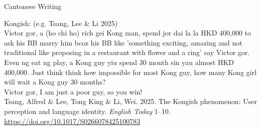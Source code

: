 \documentclass{beamer}
\begin{document}
\begin{frame}[fragile]{Cantonese Writing}

Kongish: (e.g. Tsang, Lee \& Li 2025)\\

\bigskip
Victor gor, a (ho chi ho) rich gei Kong man, spend jor dai la la HKD 400,000 to ask his BB marry him bcoz his BB like 'something exciting, amazing and not traditional like proposing in a restaurant with flower and a ring' say Victor gor.\\
\smallskip
Even ng eat ng play, a Kong guy yiu spend 30 month sin yau almost HKD 400,000. Just think think how impossible for most Kong guy, how many Kong girl will wait a Kong guy 30 months?\\
\smallskip
Victor gor, I am just a poor guy, so you win!\\

\vfill {} {\tiny Tsang, Alfred \& Lee, Tong King \& Li, Wei. 2025. The Kongish phenomenon: User perception and language identity. \textit{English Today} 1–10. \url{https://doi.org/10.1017/S0266078425100783
}}\par
\end{frame}
\end{document}
